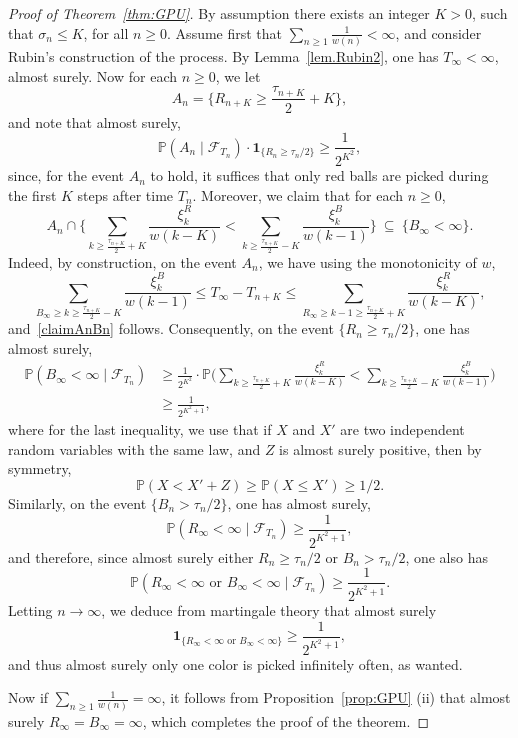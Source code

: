 \documentclass[10pt,a4paper]{amsart}
\newcommand{\1}{{\text{\Large $\mathfrak 1$}}}
\begin{document}
\begin{proof}[Proof of Theorem~\ref{thm:GPU}]
By assumption there exists an integer $K>0$, such that $\sigma_n\le K$, for all $n\ge 0$. Assume first that $\sum_{n\ge 1} \frac 1{w(n)}<\infty$, and consider Rubin's construction of the process. 
By Lemma~\ref{lem.Rubin2}, one has $T_\infty<\infty$, almost surely. Now for each $n\ge 0$, we let  
$$A_n = \big\{R_{n+K} \ge \frac{\tau_{n+K}}2 + K\big\},$$
and note that almost surely, 
\begin{equation}\label{prob.An}
\mathbb P(A_n\mid  \mathcal F_{T_n})\cdot \mathbf 1_{\{R_n \ge \tau_n/ 2 \}} \ge \frac{1}{2^{K^2}},
\end{equation}
since, for the event $A_n$ to hold, it suffices that only red balls are picked during the first $K$ steps after time $T_n$. Moreover, we claim that for each $n\ge 0$, 
\begin{equation}\label{claimAnBn}
A_n \cap \Big\{\sum_{k \ge \frac{\tau_{n+K}}{2} + K}  \frac{\xi_k^R}{w(k-K)}<\sum_{k \ge\frac{\tau_{n+K}}{2} - K} \frac{\xi_k^B}{w(k-1)}\Big\} \ \subseteq \ \{B_\infty<\infty\}. 
\end{equation}
Indeed, by construction, on the event $A_n$, we have using the monotonicity of $w$, 
$$ \sum_{B_\infty \ge k \ge  \frac{\tau_{n+K}}{2} - K}  \frac{\xi_k^B}{w(k-1)}\le T_\infty- T_{n+K} \le \sum_{R_\infty  \ge k-1 \ge \frac{\tau_{n+K}}{2} + K}  \frac{\xi_k^R}{w(k-K)},$$
and~\eqref{claimAnBn} follows. Consequently, on the event $\{R_n \ge \tau_n/ 2 \}$, one has almost surely, 
\begin{align*}
\mathbb P(B_\infty<\infty\mid\mathcal F_{T_n})  & \ge  \frac{1}{2^{K^2}} \cdot \mathbb P\Big(\sum_{k \ge \frac{\tau_{n+K}}{2} + K}  \frac{\xi_k^R}{w(k-K)}<\sum_{k \ge\frac{\tau_{n+K}}{2} - K} \frac{\xi_k^B}{w(k-1)}\Big) \\ 
&  \ge  \frac{1}{2^{K^2+1}}, 
\end{align*}
where for the last inequality, we use that if $X$ and $X'$ are two independent random variables with the same law, and $Z$ is almost surely positive, then by symmetry, 
$$\mathbb P(X<X' + Z) \ge \mathbb P(X\le X') \ge 1/2.$$  
Similarly, on the event $\{B_n >\tau_n/ 2 \}$, one has almost surely, 
$$\mathbb P(R_\infty<\infty\mid\mathcal F_{T_n}) \ge \frac{1}{2^{K^2+1}}, $$
and therefore, since almost surely either $R_n\ge \tau_n/2$ or $B_n > \tau_n / 2$, one also has 
$$\mathbb P(R_\infty<\infty\text{ or }B_\infty<\infty \mid\mathcal F_{T_n}) \ge \frac{1}{2^{K^2+1}}. $$ 
Letting $n\to \infty$, we deduce from martingale theory that almost surely 
$$\mathbf 1_{\{R_\infty<\infty\text{ or }B_\infty<\infty \}} \ge  \frac{1}{2^{K^2+1}}, $$ 
and thus almost surely only one color is picked infinitely often, as wanted. 


Now if $\sum_{n\ge 1} \frac 1{w(n)} = \infty$, it follows from Proposition~\ref{prop:GPU} (ii) that almost surely $R_\infty = B_\infty = \infty$, which completes the proof of the theorem. 
\end{proof}
\end{document}
